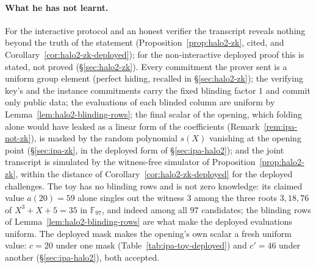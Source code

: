 \documentclass[11pt,a4paper]{article}
\theoremstyle{definition}
\newcommand{\F}{\mathbb{F}}
\begin{document}
\paragraph{What he has not learnt.}
For the interactive protocol and an honest verifier the transcript
reveals nothing beyond the truth of the statement
(Proposition~\ref{prop:halo2-zk},
cited, and Corollary~\ref{cor:halo2-zk-deployed}); for the
non-interactive deployed proof this is stated, not proved
(\S\ref{sec:halo2-zk}). Every
commitment the prover sent is a uniform group element (perfect hiding,
recalled in \S\ref{sec:halo2-zk}); the verifying key's and the instance
commitments carry the fixed blinding factor $1$ and commit only public
data; the evaluations
of each blinded column are uniform by
Lemma~\ref{lem:halo2-blinding-rows}; the final scalar of the
opening, which folding alone would have leaked as a linear form of the
coefficients (Remark~\ref{rem:ipa-not-zk}), is masked by the random
polynomial $s(X)$ vanishing at the opening point
(\S\ref{sec:ipa-zk}, in the deployed form of \S\ref{sec:ipa-halo2}); and
the joint transcript is simulated by the
witness-free simulator of Proposition~\ref{prop:halo2-zk}, within the
distance of Corollary~\ref{cor:halo2-zk-deployed} for the deployed
challenges.
The toy has no blinding rows and is not zero knowledge: its claimed
value $a(20) = 59$ alone singles out the witness $3$ among the three
roots $3, 18, 76$ of $X^3 + X + 5 = 35$ in $\F_{97}$, and indeed among all
$97$ candidates; the blinding rows of
Lemma~\ref{lem:halo2-blinding-rows} are what make the deployed
evaluations uniform. The deployed mask makes the opening's own scalar a
fresh uniform value:
$c = 20$ under one mask (Table~\ref{tab:ipa-toy-deployed}) and $c' = 46$
under another (\S\ref{sec:ipa-halo2}), both accepted.
\end{document}
